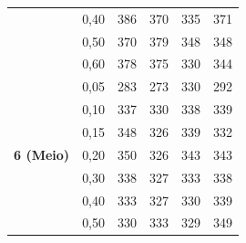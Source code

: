 \begin{table}
\begin{tabular}{clrrrr}
                                                          & 0,40                                                            & 386                        & 370                        & 335                        & 371                         \\
                                                          & 0,50                                                            & 370                        & 379                        & 348                        & 348                         \\
                                                          & 0,60                                                            & 378                        & 375                        & 330                        & 344                         \\ 
    \hline
    \multirow{8}{*}{\textbf{6 (Meio)}}                    & 0,05                                                            & 283                        & 273                        & 330                        & 292                         \\
                                                          & 0,10                                                            & 337                        & 330                        & 338                        & 339                         \\
                                                          & 0,15                                                            & 348                        & 326                        & 339                        & 332                         \\
                                                          & 0,20                                                            & 350                        & 326                        & 343                        & 343                         \\
                                                          & 0,30                                                            & 338                        & 327                        & 333                        & 338                         \\
                                                          & 0,40                                                            & 333                        & 327                        & 330                        & 339                         \\
                                                          & 0,50                                                            & 330                        & 333                        & 329                        & 349                         \\

\end{tabular}
\end{table}
